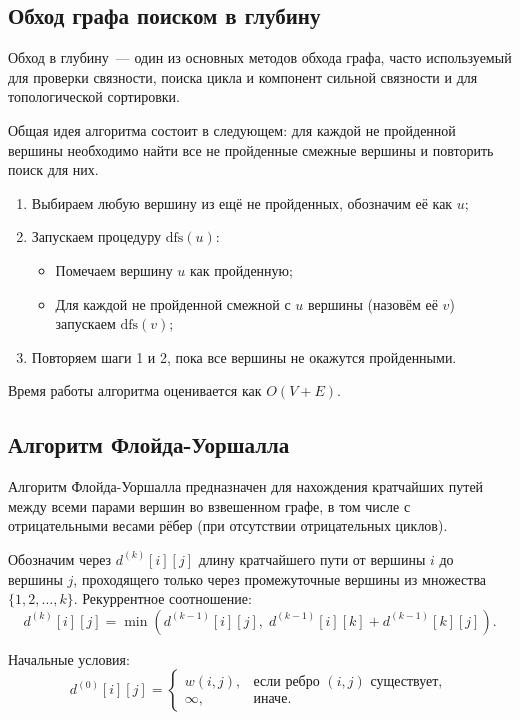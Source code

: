 \documentclass[a4paper,final]{article}
\begin{document}
	\subsection{Обход графа поиском в глубину}

Обход в глубину~--- один из основных методов обхода графа, часто используемый для проверки связности, поиска цикла и компонент сильной связности и для топологической сортировки.

Общая идея алгоритма состоит в следующем: для каждой не пройденной вершины необходимо найти все не пройденные смежные вершины и повторить поиск для них.

\begin{enumerate}
  \item Выбираем любую вершину из ещё не пройденных, обозначим её как $u$;
  \item Запускаем процедуру $\mathrm{dfs}(u)$:
  \begin{itemize}
    \item Помечаем вершину $u$ как пройденную;
    \item Для каждой не пройденной смежной с $u$ вершины (назовём её $v$) запускаем $\mathrm{dfs}(v)$;
  \end{itemize}
  \item Повторяем шаги 1 и 2, пока все вершины не окажутся пройденными.
\end{enumerate}

Время работы алгоритма оценивается как $O(V+E)$.

	\subsection{Алгоритм Флойда-Уоршалла}

Алгоритм Флойда-Уоршалла предназначен для нахождения кратчайших путей между всеми парами вершин во взвешенном графе, в том числе с отрицательными весами рёбер (при отсутствии отрицательных циклов).

Обозначим через $d^{(k)}[i][j]$ длину кратчайшего пути от вершины $i$ до вершины $j$, проходящего только через промежуточные вершины из множества $\{1, 2, \ldots, k\}$. Рекуррентное соотношение:
\[
d^{(k)}[i][j] = \min\!\left(d^{(k-1)}[i][j],\; d^{(k-1)}[i][k] + d^{(k-1)}[k][j]\right).
\]

Начальные условия:
\[
d^{(0)}[i][j] = \begin{cases} w(i,j), & \text{если ребро } (i,j) \text{ существует},\\ \infty, & \text{иначе}. \end{cases}
\]
\end{document}
